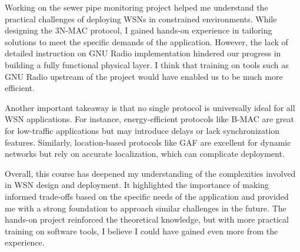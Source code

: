 Working on the sewer pipe monitoring project helped me understand the practical challenges of deploying WSNs in constrained environments. While designing the 3N-MAC protocol, I gained hands-on experience in tailoring solutions to meet the specific demands of the application. However, the lack of detailed instruction on GNU Radio implementation hindered our progress in building a fully functional physical layer. I think that training on tools such as GNU Radio upstream of the project would have enabled us to be much more efficient.
\vspace{0.25cm}

Another important takeaway is that no single protocol is universally ideal for all WSN applications. For instance, energy-efficient protocols like B-MAC are great for low-traffic applications but may introduce delays or lack synchronization features. Similarly, location-based protocols like GAF are excellent for dynamic networks but rely on accurate localization, which can complicate deployment.
\vspace{0.25cm}

Overall, this course has deepened my understanding of the complexities involved in WSN design and deployment. It highlighted the importance of making informed trade-offs based on the specific needs of the application and provided me with a strong foundation to approach similar challenges in the future. The hands-on project reinforced the theoretical knowledge, but with more practical training on software tools, I believe I could have gained even more from the experience.